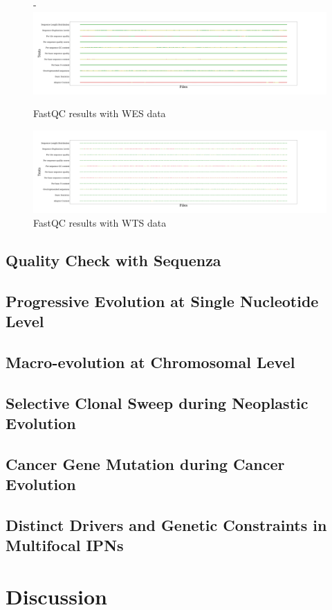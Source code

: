 \documentclass[a4paper]{article}
\begin{document}
            \begin{figure}[p]
                \centering-
               \includegraphics[width=0.8 \linewidth]{figures/FastQC/FastQC_WES.pdf}
                \caption{FastQC results  with WES data}
                \label{fig:fastqc-wes}
            \end{figure}

            \begin{figure}[p]
                \centering
                \includegraphics[width=0.8 \linewidth]{figures/FastQC/FastQC_WTS.pdf}
                \caption{FastQC results with WTS data}
                \label{fig:fastqc-wts}
            \end{figure}

        \subsection{Quality Check with Sequenza}

        \subsection{Progressive Evolution at Single Nucleotide Level}

        \subsection{Macro-evolution at Chromosomal Level}

        \subsection{Selective Clonal Sweep during Neoplastic Evolution}

        \subsection{Cancer Gene Mutation during Cancer Evolution}

        \subsection{Distinct Drivers and Genetic Constraints in Multifocal IPNs}

    \section{Discussion}

    
    
\end{document}
